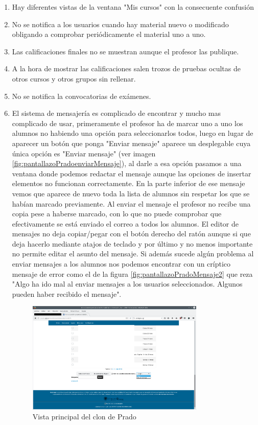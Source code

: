 \begin{enumerate}
\item Hay diferentes vistas de la ventana "Mis cursos" con la consecuente confusión

\item No se notifica a los usuarios cuando hay material nuevo o modificado obligando a comprobar periódicamente el material uno a uno.

\item Las calificaciones finales no se muestran aunque el profesor las publique.

\item A la hora de mostrar las calificaciones salen trozos de pruebas ocultas de otros cursos y otros grupos sin rellenar.

\item No se notifica la convocatorias de exámenes.

\item El sistema de mensajería es complicado de encontrar y mucho mas complicado de usar, primeramente el profesor ha de marcar uno a uno los alumnos no habiendo una opción para seleccionarlos todos, luego en lugar de aparecer un botón que ponga "Enviar mensaje" aparece un desplegable cuya única opción es "Enviar mensaje" (ver imagen \ref{fig:pantallazoPradoenviarMensaje}), al darle a esa opción pasamos a una ventana donde podemos redactar el mensaje aunque las opciones de insertar elementos no funcionan correctamente. En la parte inferior de ese mensaje vemos que aparece de nuevo toda la lista de alumnos sin respetar los que se habían marcado previamente. Al enviar el mensaje el profesor no recibe una copia pese a haberse marcado, con lo que no puede comprobar que efectivamente se está enviado el correo a todos los alumnos. El editor de mensajes no deja copiar/pegar con el botón derecho del ratón aunque si que deja hacerlo mediante atajos de teclado y por último y no menos importante no permite editar el asunto del mensaje. Si además sucede algún problema al enviar mensajes a los alumnos nos podemos encontrar con un críptico mensaje de error como el de la figura \ref{fig:pantallazoPradoMensaje2} que reza "Algo ha ido mal al enviar mensajes a los usuarios seleccionados. Algunos pueden haber recibido el mensaje".


\begin{figure}[h!]
\centering
\includegraphics[width=0.8\textwidth]{../screenshots/pantallazoPradoenviarMensaje}
\caption{Vista principal del clon de Prado}
\label{fig:Lista desplegable Enviar Mensaje}
\end{figure}


\end{enumerate}
